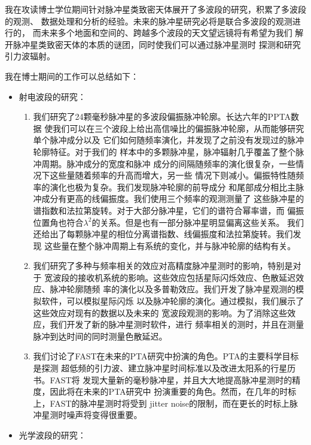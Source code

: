 

我在攻读博士学位期间针对脉冲星类致密天体展开了多波段的研究，积累了多波段的观测、
数据处理和分析的经验。未来的脉冲星研究必将是联合多波段的观测进行的，
而未来多个地面和空间的、跨越多个波段的天文望远镜将有希望为我们
解开脉冲星类致密天体的本质的谜团，同时使我们可以通过脉冲星测时
探测和研究引力波辐射。

我在博士期间的工作可以总结如下：
\begin{itemize}
\item 射电波段的研究：

\begin{enumerate}
\item 我们研究了24颗毫秒脉冲星的多波段偏振脉冲轮廓。长达六年的PPTA数据
使我们可以在三个波段上给出高信噪比的偏振脉冲轮廓，从而能够研究单个脉冲成分以及
它们如何随频率演化，并发现了之前没有发现过的脉冲轮廓特征。对于我们的
样本中的多颗脉冲星，脉冲辐射几乎覆盖了整个脉冲周期。脉冲成分的宽度和脉冲
成分的间隔随频率的演化很复杂，一些情况下这些量随着频率的升高而增大，另一些
情况下则减小。偏振特性随频率的演化也极为复杂。我们发现脉冲轮廓的前导成分
和尾部成分相比主脉冲成分有更高的线偏振度。我们使用三个频率的观测测量了
这些脉冲星的谱指数和法拉第旋转。对于大部分脉冲星，它们的谱符合幂率谱，而
偏振位置角也符合$\lambda^2$的关系。但是也有一部分脉冲星明显偏离这些关系。
我们还给出了每颗脉冲星的相位分离谱指数、线偏振度和法拉第旋转。我们发现
这些量在整个脉冲周期上有系统的变化，并与脉冲轮廓的结构有关。
\item 我们研究了多种与频率相关的效应对高精度脉冲星测时的影响，特别是对于
宽波段的接收机系统的影响。这些效应包括星际闪烁效应、色散延迟效应、脉冲轮廓随频
率的演化以及多普勒效应。我们开发了脉冲星观测的模拟软件，可以模拟星际闪烁
以及脉冲轮廓的演化。通过模拟，我们展示了这些效应对现有的数据以及未来的
宽波段观测的影响。为了消除这些效应，我们开发了新的脉冲星测时软件，进行
频率相关的测时，并且在测量脉冲到达时间的同时测量色散延迟。
\item 我们讨论了FAST在未来的PTA研究中扮演的角色。PTA的主要科学目标是探测
超低频的引力波、建立脉冲星时间标准以及改进太阳系的行星历书。FAST将
发现大量新的毫秒脉冲星，并且大大地提高脉冲星测时的精度，因此将在未来的PTA研究中
扮演重要的角色。然而，在几年的时标上，FAST的脉冲星测时将受到
jitter noise的限制，而在更长的时标上脉冲星测时噪声将变得很重要。

\end{enumerate}

\item 光学波段的研究：


\end{itemize}
